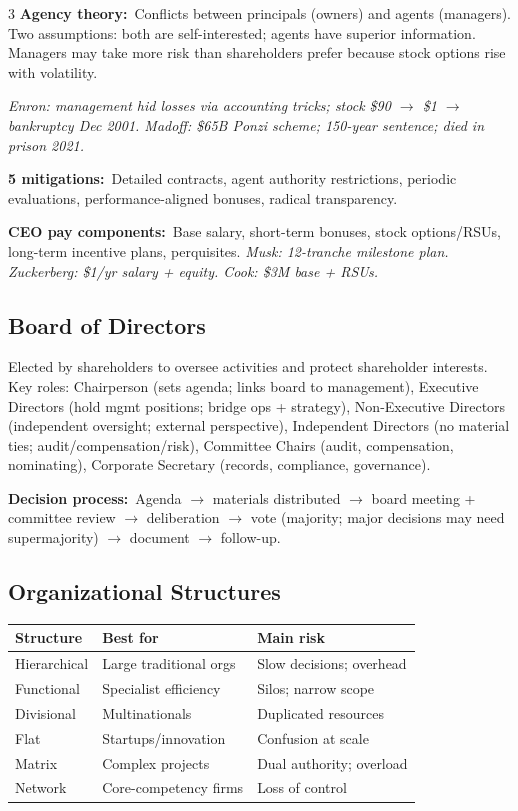 \documentclass[7.6pt,letterpaper]{article}
\newcommand{\T}[1]{\textbf{\color{navy}#1}}
\newcommand{\kk}[2]{\noindent\T{#1}\ #2\par}
\newcommand{\eg}[1]{\textit{\color{mid}#1}}
\newcommand{\sh}{\rowcolor{strip}}
\newcommand{\ctab}[1]{{\fontsize{6.2pt}{7pt}\selectfont\setlength{\tabcolsep}{2.5pt}#1}}
\begin{document}
\begin{multicols}{3}
\kk{Agency theory:}{Conflicts between principals (owners) and agents (managers). Two assumptions: both are self-interested; agents have superior information. Managers may take more risk than shareholders prefer because stock options rise with volatility.}

\eg{Enron: management hid losses via accounting tricks; stock \$90 $\to$ \$1 $\to$ bankruptcy Dec 2001. Madoff: \$65B Ponzi scheme; 150-year sentence; died in prison 2021.}

\kk{5 mitigations:}{Detailed contracts, agent authority restrictions, periodic evaluations, performance-aligned bonuses, radical transparency.}

\kk{CEO pay components:}{Base salary, short-term bonuses, stock options/RSUs, long-term incentive plans, perquisites. \eg{Musk: 12-tranche milestone plan. Zuckerberg: \$1/yr salary + equity. Cook: \$3M base + RSUs.}}

\subsection{Board of Directors}

Elected by shareholders to oversee activities and protect shareholder interests. Key roles: Chairperson (sets agenda; links board to management), Executive Directors (hold mgmt positions; bridge ops + strategy), Non-Executive Directors (independent oversight; external perspective), Independent Directors (no material ties; audit/compensation/risk), Committee Chairs (audit, compensation, nominating), Corporate Secretary (records, compliance, governance).

\kk{Decision process:}{Agenda $\to$ materials distributed $\to$ board meeting + committee review $\to$ deliberation $\to$ vote (majority; major decisions may need supermajority) $\to$ document $\to$ follow-up.}

\subsection{Organizational Structures}

\ctab{\begin{tabular}{@{}p{1.3cm}p{2.3cm}p{2.0cm}@{}}
\toprule
\sh \T{Structure} & \T{Best for} & \T{Main risk} \\
\midrule
Hierarchical & Large traditional orgs & Slow decisions; overhead \\
Functional & Specialist efficiency & Silos; narrow scope \\
Divisional & Multinationals & Duplicated resources \\
Flat & Startups/innovation & Confusion at scale \\
Matrix & Complex projects & Dual authority; overload \\
Network & Core-competency firms & Loss of control \\
\bottomrule
\end{tabular}}


\end{multicols}
\end{document}
